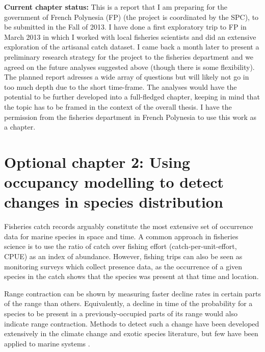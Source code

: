 \documentclass{article}
\begin{document}
\textbf{Current chapter status:} This is a report that I am preparing for the government of
French Polynesia (FP) (the project is coordinated by the SPC), to be
submitted in the Fall of 2013. I have done a first exploratory trip to
FP in March 2013 in which I worked with local fisheries scientists and
did an extensive exploration of the artisanal catch dataset. I came
back a month later to present a preliminary research strategy for the
project to the fisheries department and we agreed on the future
analyses suggested above (though there is some flexibility). The
planned report adresses a wide array of questions but will
likely not go in too much depth due to the short time-frame. The
analyses would have the potential to be further developed into a
full-fledged chapter, keeping in mind that the topic has to be framed
in the context of the overall thesis. I have the permission from the
fisheries department in French Polynesia to use this work as a
chapter.


\newpage
\section*{Optional chapter 2: Using occupancy modelling to detect changes in
  species distribution}

Fisheries catch records arguably constitute the most extensive set of
occurrence data for marine species in space and time. A common
approach in fisheries science is to use the ratio of catch over
fishing effort (catch-per-unit-effort, CPUE) as an index of abundance.
However, fishing trips can also be seen as monitoring surveys which
collect presence data, as the occurrence of a given species in the catch
shows that the species was present at that time and location.


Range contraction can be shown by measuring faster decline rates in
certain parts of the range than others. Equivalently, a decline in
time of the probability for a species to be present in a
previously-occupied parts of its range would also indicate range
contraction. Methods to detect such a change have been developed
extensively in the climate change and exotic species literature, but
few have been applied to marine systems \citep{Robinson2011_a}.
\end{document}
